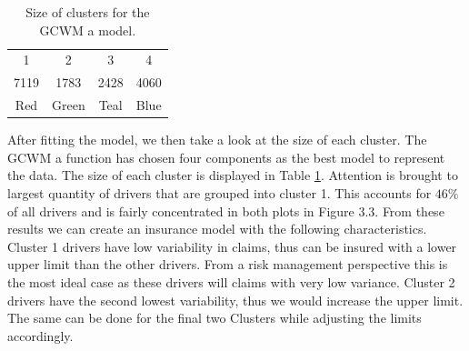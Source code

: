 \documentclass[11pt,letterpaper]{article}
\numberwithin{equation}{section}
\numberwithin{equation}{section}
\numberwithin{equation}{section}
\begin{document}
\begin{table}[!htb]
\centering
\caption{Size of clusters for the GCWM a model.}
\label{table:sizeSev}
\begin{tabular}{cccc}
\hline\hline
1   & 2  &  3   & 4    \\
7119 &1783& 2428& 4060 \\
Red & Green & Teal & Blue \\
\hline\hline
\end{tabular}
\end{table}

After fitting the model, we then take a look at the size of each cluster. The GCWM a function has chosen four components as the best model to represent the data. The size of each cluster is displayed in Table \ref{table:sizeSev}. Attention is brought to largest quantity  of drivers that are grouped into cluster 1. This accounts for $ 46 \% $ of all drivers and is fairly concentrated in both plots in Figure 3.3.
From these results we can create an insurance model with the following characteristics. Cluster 1 drivers have low variability in claims, thus can be insured with a lower upper limit than the other drivers. From a risk management perspective this is the most ideal case as these drivers will claims with very  low variance. Cluster 2 drivers have the second lowest variability, thus we would increase the upper limit. The same can be done for the final two Clusters while adjusting  the limits accordingly.
\begin{table}[!htb]
\centering
\caption{Summarized volatility information of each cluster.}
\label{table:volSev}
\end{table}
\end{document}
